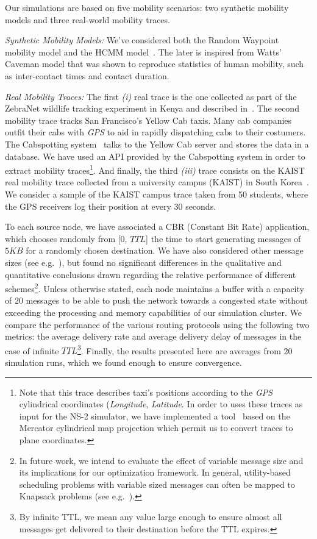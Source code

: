 Our simulations are based on five mobility scenarios: two synthetic mobility models and three real-world mobility traces.

\emph{Synthetic Mobility Models:} We've considered both the Random Waypoint mobility model and the HCMM model~\cite{HCMM}. The later is inspired from Watts' Caveman model that was shown to reproduce statistics of human mobility, such as inter-contact times and contact duration.

\emph{Real Mobility Traces:} The first \emph{(i)} real trace is the one collected as part of the ZebraNet wildlife tracking experiment in Kenya and described in~\cite{ZebraNetMovement}. The second mobility trace tracks San Francisco's Yellow Cab taxis. Many cab companies outfit their cabs with \emph{GPS} to aid in rapidly dispatching
cabs to their costumers. The Cabspotting system~\cite{Cabspotting} talks to the Yellow Cab server and stores the data in a database. We have used an API provided by the Cabspotting system in order to extract mobility traces\footnote{Note that this trace describes taxi's positions according to the \emph{GPS} cylindrical coordinates (\emph{Longitude}, \emph{Latitude}. In order to uses these traces as input for the NS-2 simulator, we have implemented a tool~\cite{DTN-NS2} based on the Mercator cylindrical map projection which permit us to convert traces to plane coordinates.}. And finally, the third \emph{(iii)} trace consists on the KAIST real mobility trace collected from a university campus (KAIST) in South Korea~\cite{KAIST}. We consider a sample of the KAIST campus trace taken from 50 students, where the GPS receivers log their position at every 30 seconds. 

To each source node, we have associated a CBR (Constant Bit Rate) application, which chooses randomly from [0, $TTL$] the time to start generating messages of $5KB$ for a randomly chosen destination. We have also considered other message sizes (see e.g.~\cite{KrifaBS08}), but found no significant differences in the qualitative and quantitative conclusions drawn regarding the relative performance of different schemes\footnote{In future work, we intend to evaluate the effect of variable message size and its implications for our optimization framework. In general, utility-based scheduling problems with variable sized messages can often be mapped to Knapsack problems (see e.g.~\cite{Boldrini:MSWIM08}).}.
Unless otherwise stated, each node maintains a buffer with a capacity of $20$ messages to be able to push the network towards a congested state without exceeding the processing and memory capabilities of our simulation cluster. We compare the performance of the various routing protocols using the following two metrics: the average delivery rate and average delivery delay of messages in the case of infinite $TTL$\footnote{By infinite TTL, we mean any value large enough to ensure almost all messages get delivered to their destination before the TTL expires.}. Finally, the results presented here are averages from 20 simulation runs, which we found enough to ensure convergence.

